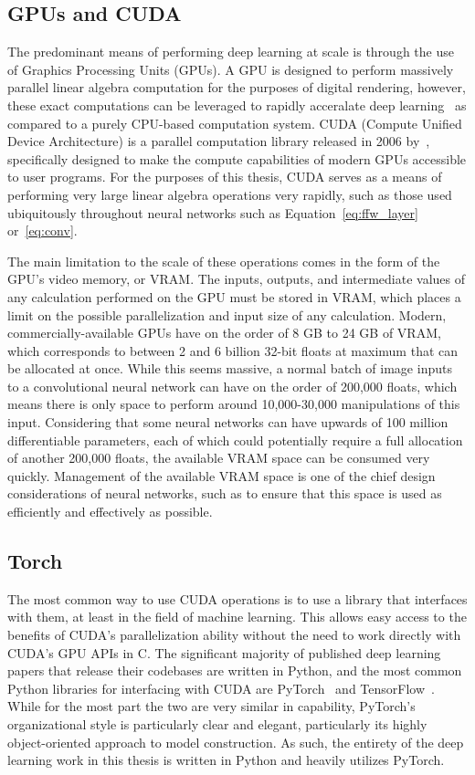 \subsection{GPUs and CUDA}
The predominant means of performing deep learning at scale is through the use of Graphics Processing
Units (GPUs). A GPU is designed to perform massively parallel linear algebra computation for the purposes
of digital rendering, however, these exact computations can be leveraged to rapidly acceralate deep learning~\citep{kriv2012}
as compared to a purely CPU-based computation system.
CUDA (Compute Unified Device Architecture) is a parallel computation library released in 2006 by~\citeauthor{CUDASite},
specifically designed to make the compute capabilities of modern GPUs accessible to user programs. For the purposes of this thesis, CUDA serves
as a means of performing very large linear algebra operations very rapidly,
such as those used ubiquitously throughout neural networks such as Equation~\ref{eq:ffw_layer} or~\ref{eq:conv}.

The main limitation to the scale of these operations comes in the form of the GPU's video memory, or VRAM.
The inputs, outputs, and intermediate
values of any calculation performed on the GPU must be stored in VRAM, which places a limit on the possible
parallelization and input size of any calculation. Modern, commercially-available GPUs have on the order of
8 GB to 24 GB of VRAM, which corresponds to between 2 and 6 billion 32-bit floats at maximum that can be allocated at once.
While this seems massive, a normal batch of image inputs to a convolutional neural network can have on the order of
200,000 floats, which means there is only space to perform around 10,000-30,000 manipulations of this input.
Considering that some neural networks can have upwards of 100 million differentiable parameters, each of which could potentially
require a full allocation of another 200,000 floats, the available VRAM space can be consumed very quickly. Management
of the available VRAM space is one of the chief design considerations of neural networks, such as to ensure that this
space is used as efficiently and effectively as possible.

\subsection{Torch}
The most common way to use CUDA operations is to use a library that interfaces with them, at least in the field of
machine learning. This allows easy access to the benefits of CUDA's parallelization ability without the need to work
directly with CUDA's GPU APIs in C. The significant majority of published deep learning papers that release their codebases
are written in Python, and the most common Python libraries for interfacing with CUDA are PyTorch~\citep{paszke2019}
and TensorFlow~\citep{abadi2016}. While for the most part the two are very similar in capability, PyTorch's
organizational style is particularly clear and elegant, particularly its highly object-oriented approach to model construction.
As such, the entirety of the deep learning work in this thesis is written in Python and heavily utilizes PyTorch.


